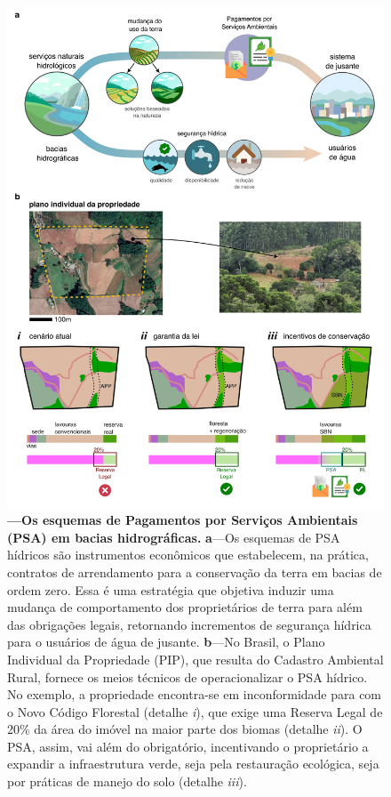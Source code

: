 \documentclass[./main.tex]{subfiles}
\begin{document}
\begin{figure}[t!] 
\centering				
\includegraphics[width=0.98\linewidth]{figs/fig_pes.jpg}		
\caption[Os esquemas de Pagamentos por Serviços Ambientais]
{\textbf{---\;Os esquemas de Pagamentos por Serviços Ambientais (PSA) em bacias hidrográficas.}     
    \;\textbf{a}\;---\;Os esquemas de PSA hídricos são instrumentos econômicos que estabelecem, na prática, contratos de arrendamento para a conservação da terra em bacias de ordem zero. Essa é uma estratégia que objetiva induzir uma mudança de comportamento dos proprietários de terra para além das obrigações legais, retornando incrementos de segurança hídrica para o usuários de água de jusante.
    \;\textbf{b}\;---\;No Brasil, o Plano Individual da Propriedade (PIP), que resulta do Cadastro Ambiental Rural, fornece os meios técnicos de operacionalizar o PSA hídrico. No exemplo, a propriedade encontra-se em inconformidade para com o Novo Código Florestal (detalhe \textrm{\textit{i}}), que exige uma Reserva Legal de 20\% da área do imóvel na maior parte dos biomas (detalhe \textrm{\textit{ii}}). O PSA, assim, vai além do obrigatório, incentivando o proprietário a expandir a infraestrutura verde, seja pela restauração ecológica, seja por práticas de manejo do solo (detalhe \textrm{\textit{iii}}).
}
\label{fig:eco:pes} 		
\end{figure}
\end{document}
